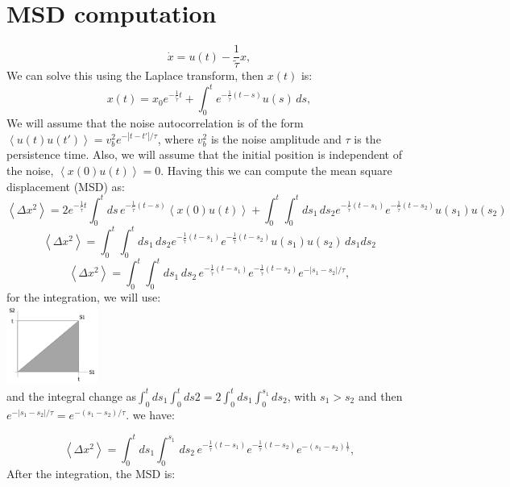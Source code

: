 \documentclass[%
10pt,
superscriptaddress,
twocolumn,
 amsmath,amssymb,
 aps,prx,
]{revtex4-2}
\begin{document}
\section{MSD computation}
\begin{equation}
	\label{langevin}
	\dot{x}=u(t)-\frac{1}{\tilde{\tau}} x,
\end{equation} 
We can solve this using the Laplace transform, then $x(t)$ is:
\begin{equation}
	x(t)  = x_0 e^{-\frac{1}{\tilde{\tau}} t}+\int_{0}^{t}e^{-\frac{1}{\tilde{\tau}}(t-s)}u(s)\, ds,
\end{equation}
We will assume that the noise autocorrelation is of the form $\left<u(t)u(t')\right>=v_b^2e^{-|t-t'|/\tau}$, where $v_b^2$ is the noise amplitude and $\tau$ is the persistence time. Also, we will assume that the initial position is independent of the noise, $\left<x(0)u(t)\right>=0$. Having this we can compute the mean square displacement (MSD) as:
\begin{equation}
	\left<\Delta x^2\right>=2e^{-\frac{1}{\tilde{\tau}} t} \int_{0}^{t}ds\, e^{-\frac{1}{\tilde{\tau}}(t-s)}\left<x(0)u(t)\right> +\int_{0}^{t}\int_{0}^{t} ds_1 \, ds_2 e^{-\frac{1}{\tilde{\tau}}(t-s_1)}e^{-\frac{1}{\tilde{\tau}}(t-s_2)}u(s_1)u(s_2)
\end{equation}
\begin{equation}
	\left<\Delta x^2\right>=\int_{0}^{t}\int_{0}^{t} ds_1 \, ds_2 e^{-\frac{1}{\tilde{\tau}}(t-s_1)}e^{-\frac{1}{\tilde{\tau}}(t-s_2)}u(s_1)u(s_2)\, ds_1 ds_2
\end{equation}
\begin{equation}
	\left<\Delta x^2\right>=\int_{0}^{t}\int_{0}^{t}ds_1 \, ds_2\, e^{-\frac{1}{\tilde{\tau}}(t-s_1)}e^{-\frac{1}{\tilde{\tau}}(t-s_2)}e^{-|s_1-s_2|/\tau},
\end{equation}
for the integration, we will use:\\
\includegraphics[width=3cm]{Integracion.png}\\
and the integral change as$\int_{0}^{t} ds_1 \int_{0}^{t} ds2= 2 \int_{0}^{t}ds_1 {\int_{0}^{s_1}}  ds_2$, with  $s_1>s_2$ and then $e^{-|s_1-s_2|/\tau}=e^{-(s_1-s_2)/\tau}$.
we have: 

\begin{equation}
	\left<\Delta x^2\right>=\int_{0}^{t}ds_1\int_{0}^{s_1} \, ds_2\, e^{-\frac{1}{\tilde{\tau}}(t-s_1)}e^{-\frac{1}{\tilde{\tau}}(t-s_2)}e^{-(s_1-s_2)\frac{1}{\tau}},
\end{equation}
After the integration, the MSD is:
\end{document}
